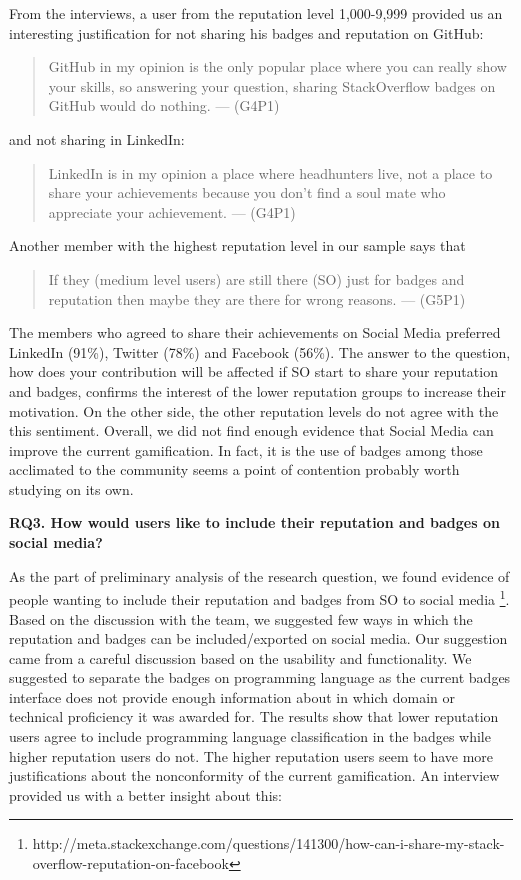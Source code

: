 \documentclass{sigchi}
\begin{document}
From the interviews, a user from the reputation level 1,000-9,999 provided us an interesting justification for not sharing his badges and reputation on GitHub:
\begin{quote}
GitHub in my opinion is the only popular place where you can really show your skills, so answering your question, sharing StackOverflow badges on GitHub would do nothing. --- (G4P1)
\end{quote}
and not sharing in LinkedIn:
\begin{quote}
LinkedIn is in my opinion a place where headhunters live, not a place to share your achievements because you don’t find a soul mate who appreciate your achievement. --- (G4P1)
\end{quote}
Another member with the highest reputation level in our sample says that
\begin{quote}
 If they (medium level users) are still there (SO) just for badges and reputation then maybe they are there for wrong reasons. --- (G5P1)
 \end{quote}

The members who agreed to share their achievements on Social Media preferred LinkedIn (91\%), Twitter (78\%) and Facebook (56\%). The answer to the question, how does your contribution will be affected if SO start to share your reputation and badges, confirms the interest of the lower reputation groups to increase their motivation. On the other side, the other reputation levels  do not agree with the this sentiment. Overall, we did not find enough evidence that Social Media can improve the current gamification. In fact, it is the use of badges among those acclimated to the community seems a point of contention probably worth studying on its own.

\textbf{RQ3. How would users like to include their reputation and badges on social media?}

As the part of preliminary analysis of the research question, we found evidence of people wanting to include their reputation and badges from SO to social media \footnote{http://meta.stackexchange.com/questions/141300/how-can-i-share-my-stack-overflow-reputation-on-facebook}. Based on the discussion with the team, we suggested few ways in which the reputation and badges can be included/exported on social media. Our suggestion came from a careful discussion based on the usability and functionality. We suggested to separate the badges on programming language as the current badges interface does not provide enough information about in which domain or technical proficiency it was awarded for. The results show that lower reputation users agree to include programming language classification in the badges while higher reputation users do not. The higher reputation users seem to have more justifications about the nonconformity of the current gamification. An interview provided us with  a better insight about this:
\end{document}
